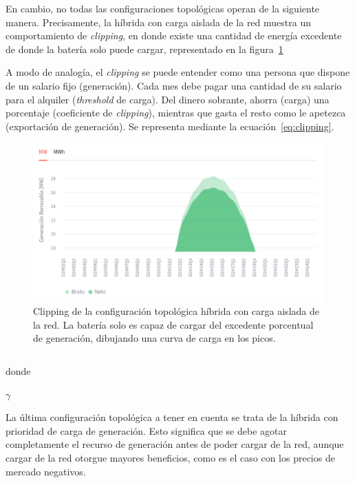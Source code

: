En cambio, no todas las configuraciones topológicas operan de la siguiente manera. Precisamente, la híbrida con carga aislada de la red muestra un comportamiento de \textit{clipping}, en donde existe una cantidad de energía excedente de donde la batería solo puede cargar, representado en la figura~\ref{fig:clipping}

A modo de analogía, el \textit{clipping} se puede entender como una persona que dispone de un salario fijo (generación). Cada mes debe pagar una cantidad de su salario para el alquiler (\textit{threshold} de carga). Del dinero sobrante, ahorra (carga) una porcentaje (coeficiente de \textit{clipping}), mientras que gasta el resto como le apetezca (exportación de generación). Se representa mediante la ecuación~\ref{eq:clipping}.

\begin{figure}
  \centering
  \includegraphics[width=0.75\linewidth]{figures/clipping.png}
  \caption[Clipping de configuración topológica híbrida.]{Clipping de la configuración topológica híbrida con carga aislada de la red. La batería solo es capaz de cargar del excedente porcentual de generación, dibujando una curva de carga en los picos.}%
  \label{fig:clipping}
\end{figure}

\begin{equation}%
  \label{eq:clipping}
\end{equation}

donde

\( \gamma \)


La última configuración topológica a tener en cuenta se trata de la híbrida con prioridad de carga de generación. Esto significa que se debe agotar completamente el recurso de generación antes de poder cargar de la red, aunque cargar de la red otorgue mayores beneficios, como es el caso con los precios de mercado negativos.

